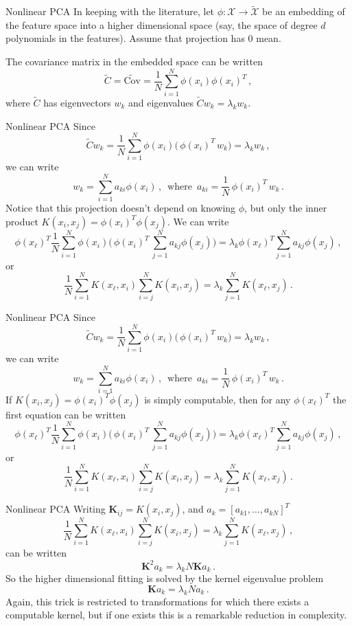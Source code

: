 \documentclass[10pt, table, dvipsnames,xcdraw,handout]{beamer}
\begin{document}
\begin{frame}[fragile]{Nonlinear PCA}
In keeping with the literature, let $\phi:\mathcal{X}\to \widetilde{\mathcal{X}}$ be an embedding of the feature space into a higher dimensional space (say, the space of degree $d$ polynomials in the features). \pause Assume that projection has 0 mean. \pause

The covariance matrix in the embedded space can be written
$$
\widetilde{C} = \widetilde{\text{Cov}} = \frac{1}{N}\sum_{i=1}^N\phi(x_i)\phi(x_i)^T\,,
$$\pause
where $\tilde{C}$ has eigenvectors $w_k$ and eigenvalues $\widetilde{C}w_k = \lambda_kw_k$. 
\end{frame}



\begin{frame}[fragile]{Nonlinear PCA}
Since 
$$
\widetilde{C}w_k = \frac{1}{N}\sum_{i=1}^N\phi(x_i)\big(\,\phi(x_i)^T\,w_k\big) = \lambda_kw_k\,,
$$\pause
we can write
$$
w_k = \sum_{i=1}^N a_{ki}\phi(x_i)\,,\,\,\,\text{where}\,\,\, a_{ki} = \frac{1}{N}\,\phi(x_i)^T\,w_k\,.
$$\pause
Notice that this projection doesn't depend on knowing $\phi$, but only the inner product $K(x_i,x_j) = \phi(x_i)^T\phi(x_j)$. We can write
$$
\phi(x_\ell)^T\frac{1}{N}\sum_{i=1}^N\phi(x_i)\big(\,\phi(x_i)^T\,\sum_{j=1}^N a_{kj}\phi(x_j)\big) = \lambda_k\phi(x_\ell)^T\sum_{j=1}^N a_{kj}\phi(x_j)\,,
$$\pause
or
$$
\frac{1}{N}\sum_{i=1}^NK(x_\ell, x_i)\sum_{i=j}^N K(x_i, x_j) = \lambda_k\sum_{j=1}^N K(x_\ell, x_j)\,.
$$
\end{frame}



\begin{frame}[fragile]{Nonlinear PCA}
Since 
$$
\widetilde{C}w_k = \frac{1}{N}\sum_{i=1}^N\phi(x_i)\big(\,\phi(x_i)^T\,w_k\big) = \lambda_kw_k\,,
$$\pause
we can write
$$
w_k = \sum_{i=1}^N a_{ki}\phi(x_i)\,,\,\,\,\text{where}\,\,\, a_{ki} = \frac{1}{N}\,\phi(x_i)^T\,w_k\,.
$$\pause
If $K(x_i,x_j) = \phi(x_i)^T\phi(x_j)$ is simply computable, then for any $\phi(x_\ell)^T$ the first equation can be written
$$
\phi(x_\ell)^T\frac{1}{N}\sum_{i=1}^N\phi(x_i)\big(\,\phi(x_i)^T\,\sum_{j=1}^N a_{kj}\phi(x_j)\big) = \lambda_k\phi(x_\ell)^T\sum_{j=1}^N a_{kj}\phi(x_j)\,,
$$\pause
or
$$
\frac{1}{N}\sum_{i=1}^NK(x_\ell, x_i)\sum_{i=j}^N K(x_i, x_j) = \lambda_k\sum_{j=1}^N K(x_\ell, x_j)\,.
$$
\end{frame}





\begin{frame}[fragile]{Nonlinear PCA}
Writing $\mathbf{K}_{ij} = K(x_i,x_j)$, and $a_k = [a_{k1},\ldots, a_{kN}]^T$ \pause
$$
\frac{1}{N}\sum_{i=1}^NK(x_\ell, x_i)\sum_{i=j}^N K(x_i, x_j) = \lambda_k\sum_{j=1}^N K(x_\ell, x_j)\,,
$$
can be written
$$
\mathbf{K}^2a_k = \lambda_kN\mathbf{K}a_k\,.
$$\pause
So the higher dimensional fitting is solved by the kernel eigenvalue problem
$$
\mathbf{K}a_k = \lambda_kNa_k\,.
$$\pause
Again, this trick is restricted to transformations for which there exists a computable kernel, but if one exists this is a remarkable reduction in complexity. 
\end{frame}
\end{document}
